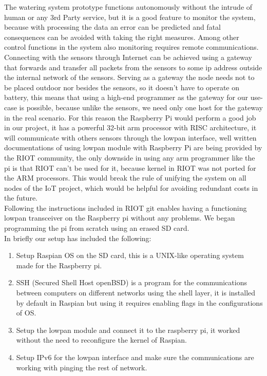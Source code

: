 \documentclass[11pt,paper=a4,parskip=half]{scrartcl}
\begin{document}
The watering system prototype functions autonomously without the intrude of human or any 3rd Party service, but it is a good feature to monitor the system, because with processing the data an error can be predicted and fatal consequences can be avoided with taking the right measures. Among other control functions in the system also monitoring requires remote communications.
Connecting with the sensors through Internet can be achieved using a gateway that forwards and transfer all packets from the sensors to some ip address outside the internal network of the sensors. Serving as a gateway the node needs not to be placed outdoor nor besides the sensors, so it doesn't have to operate on battery, this means that using a high-end programmer as the gateway for our use-case is possible, because unlike the sensors, we need only one host for the gateway in the real scenario. For this reason the Raspberry Pi would perform a good job in our project, it has a powerful 32-bit arm processor with RISC architecture, it will communicate with others sensors through the lowpan interface, well written documentations of using lowpan module with Raspberry Pi are being provided by the RIOT community, the only downside in using any arm programmer like the pi is that RIOT can't be used for it, because kernel in RIOT was not ported for the ARM processors. This would break the rule of unifying the system on all nodes of the IoT project, which would be helpful for avoiding redundant costs in the future. 
\\Following the instructions included in RIOT git \cite{lowpan} enables having a functioning lowpan transceiver on the Raspberry pi without any problems. We began programming the pi from scratch using an erased SD card. 
\\
In briefly our setup has included the following:
\begin{enumerate}
	\item Setup Raspian OS on the SD card, this is a UNIX-like operating system made for the Raspberry pi.
	\item SSH (Secured Shell Host  openBSD) is a program for the communications between computers on different networks using the shell layer, it is installed by default in Raspian but using it requires enabling flags in the configurations of OS.
	\item Setup the lowpan module and connect it to the raspberry pi, it worked without the need to reconfigure the kernel of Raspian. 
	\item Setup IPv6 for the lowpan interface and make sure the communications are working with pinging the rest of network.
\end{enumerate}
\end{document}
